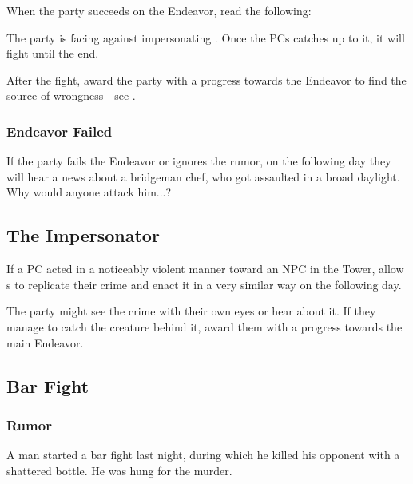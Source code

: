 When the party succeeds on the Endeavor, read the following:


The party is facing against \enemyMidnightAssassin{} impersonating \npcVeil{}. Once the PCs catches up to it, it will fight until the end.

After the fight, award the party with a progress towards the Endeavor to find the source of \locationUrithiru{} wrongness - see .

\subsubsection{Endeavor Failed}

If the party fails the Endeavor or ignores the rumor, on the following day they will hear a news about a bridgeman chef, who got assaulted in a broad daylight. Why would anyone attack him...?





\subsection{The Impersonator}

If a PC acted in a noticeably violent manner toward an NPC in the Tower, allow \enemyMidnightAssassin{}s to replicate their crime and enact it in a very similar way on the following day.

The party might see the crime with their own eyes or hear about it. If they manage to catch the creature behind it, award them with a progress towards the main Endeavor.



\newpage
\subsection{Bar Fight}
\label{ssec:mysteriousViolenceBarFight}

\subsubsection{Rumor}

A man started a bar fight last night, during which he killed his opponent with a shattered bottle. He was hung for the murder.

